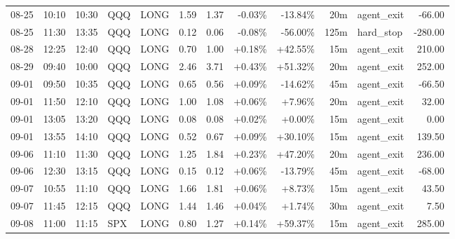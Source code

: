 \documentclass[11pt,a4paper]{article}
\begin{document}
\begin{center}
\begin{longtable}{>{\color{txtmain}}l l l l l r r r r r >{\color{txtmain}}l r}
08-25 & 10:10 & 10:30 & QQQ & LONG & 1.59 & 1.37 & \textcolor{lossred}{-0.03\%} & \textcolor{lossred}{-13.84\%} & 20m & agent\_exit & \textcolor{lossred}{-66.00} \\
08-25 & 11:30 & 13:35 & QQQ & LONG & 0.12 & 0.06 & \textcolor{lossred}{-0.08\%} & \textcolor{lossred}{-56.00\%} & 125m & hard\_stop & \textcolor{lossred}{-280.00} \\
08-28 & 12:25 & 12:40 & QQQ & LONG & 0.70 & 1.00 & \textcolor{wingreen}{+0.18\%} & \textcolor{wingreen}{+42.55\%} & 15m & agent\_exit & \textcolor{wingreen}{210.00} \\
08-29 & 09:40 & 10:00 & QQQ & LONG & 2.46 & 3.71 & \textcolor{wingreen}{+0.43\%} & \textcolor{wingreen}{+51.32\%} & 20m & agent\_exit & \textcolor{wingreen}{252.00} \\
09-01 & 09:50 & 10:35 & QQQ & LONG & 0.65 & 0.56 & \textcolor{wingreen}{+0.09\%} & \textcolor{lossred}{-14.62\%} & 45m & agent\_exit & \textcolor{lossred}{-66.50} \\
09-01 & 11:50 & 12:10 & QQQ & LONG & 1.00 & 1.08 & \textcolor{wingreen}{+0.06\%} & \textcolor{wingreen}{+7.96\%} & 20m & agent\_exit & \textcolor{wingreen}{32.00} \\
09-01 & 13:05 & 13:20 & QQQ & LONG & 0.08 & 0.08 & \textcolor{wingreen}{+0.02\%} & \textcolor{wingreen}{+0.00\%} & 15m & agent\_exit & \textcolor{wingreen}{0.00} \\
09-01 & 13:55 & 14:10 & QQQ & LONG & 0.52 & 0.67 & \textcolor{wingreen}{+0.09\%} & \textcolor{wingreen}{+30.10\%} & 15m & agent\_exit & \textcolor{wingreen}{139.50} \\
09-06 & 11:10 & 11:30 & QQQ & LONG & 1.25 & 1.84 & \textcolor{wingreen}{+0.23\%} & \textcolor{wingreen}{+47.20\%} & 20m & agent\_exit & \textcolor{wingreen}{236.00} \\
09-06 & 12:30 & 13:15 & QQQ & LONG & 0.15 & 0.12 & \textcolor{wingreen}{+0.06\%} & \textcolor{lossred}{-13.79\%} & 45m & agent\_exit & \textcolor{lossred}{-68.00} \\
09-07 & 10:55 & 11:10 & QQQ & LONG & 1.66 & 1.81 & \textcolor{wingreen}{+0.06\%} & \textcolor{wingreen}{+8.73\%} & 15m & agent\_exit & \textcolor{wingreen}{43.50} \\
09-07 & 11:45 & 12:15 & QQQ & LONG & 1.44 & 1.46 & \textcolor{wingreen}{+0.04\%} & \textcolor{wingreen}{+1.74\%} & 30m & agent\_exit & \textcolor{wingreen}{7.50} \\
09-08 & 11:00 & 11:15 & SPX & LONG & 0.80 & 1.27 & \textcolor{wingreen}{+0.14\%} & \textcolor{wingreen}{+59.37\%} & 15m & agent\_exit & \textcolor{wingreen}{285.00} \\

\end{longtable}
\end{center}
\end{document}
